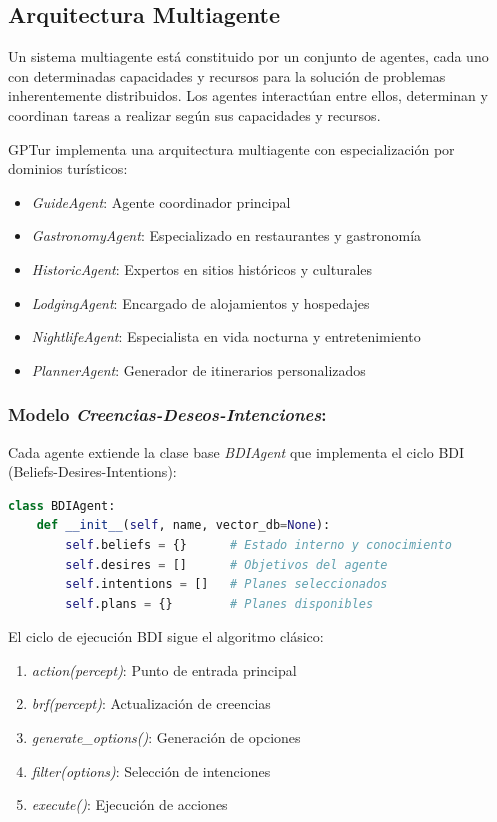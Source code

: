 \documentclass[10pt]{llncs}
\begin{document}
\vspace{\baselineskip}
\subsection{Arquitectura Multiagente \cite{Garcia2020}}

Un sistema multiagente está constituido por un conjunto de agentes, cada uno con determinadas capacidades y recursos para la solución de problemas inherentemente distribuidos. Los agentes interactúan entre ellos, determinan y coordinan tareas a realizar según sus capacidades y recursos.

GPTur implementa una arquitectura multiagente con especialización por dominios turísticos:

\begin{itemize}
    \item \textit{GuideAgent}: Agente coordinador principal
    \item \textit{GastronomyAgent}: Especializado en restaurantes y gastronomía
    \item \textit{HistoricAgent}: Expertos en sitios históricos y culturales
    \item \textit{LodgingAgent}: Encargado de alojamientos y hospedajes
    \item \textit{NightlifeAgent}: Especialista en vida nocturna y entretenimiento
    \item \textit{PlannerAgent}: Generador de itinerarios personalizados
\end{itemize}

\subsubsection{Modelo \textit{Creencias-Deseos-Intenciones}:}
Cada agente extiende la clase base \textit{BDIAgent} que implementa el ciclo BDI (Beliefs-Desires-Intentions):

\begin{lstlisting}[language=Python,basicstyle=\small\ttfamily]
class BDIAgent:
    def __init__(self, name, vector_db=None):
        self.beliefs = {}      # Estado interno y conocimiento
        self.desires = []      # Objetivos del agente
        self.intentions = []   # Planes seleccionados
        self.plans = {}        # Planes disponibles
\end{lstlisting}

El ciclo de ejecución BDI sigue el algoritmo clásico:
\begin{enumerate}
    \item \textit{action(percept)}: Punto de entrada principal
    \item \textit{brf(percept)}: Actualización de creencias
    \item \textit{generate\_options()}: Generación de opciones
    \item \textit{filter(options)}: Selección de intenciones
    \item \textit{execute()}: Ejecución de acciones
\end{enumerate}
\end{document}
